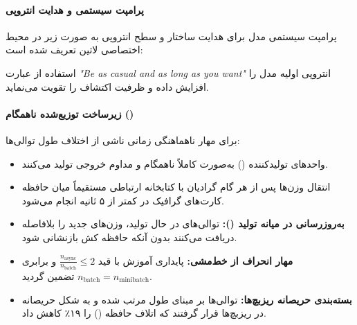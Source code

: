 \paragraph*{پرامپت سیستمی و هدایت انتروپی}
پرامپت سیستمی مدل برای هدایت ساختار و سطح انتروپی به صورت زیر در محیط اختصاصی لاتین تعریف شده است:
\begin{center}
\end{center}
استفاده از عبارت \textit{"Be as casual and as long as you want"} انتروپی اولیه مدل را افزایش داده و ظرفیت اکتشاف را تقویت می‌نماید.

\paragraph*{زیرساخت توزیع‌شده ناهمگام ()}
برای مهار ناهماهنگی زمانی ناشی از اختلاف طول توالی‌ها:
\begin{itemize}
    \item واحدهای تولیدکننده () به‌صورت کاملاً ناهمگام و مداوم خروجی تولید می‌کنند.
    \item انتقال وزن‌ها پس از هر گام گرادیان با کتابخانه ارتباطی  مستقیماً میان حافظه کارت‌های گرافیک در کمتر از ۵ ثانیه انجام می‌شود.
    \item \textbf{به‌روزرسانی در میانه تولید ():} توالی‌های در حال تولید، وزن‌های جدید را بلافاصله دریافت می‌کنند بدون آنکه حافظه کش  بازنشانی شود.
    \item \textbf{مهار انحراف از خط‌مشی:} پایداری آموزش با قید $\frac{n_{\text{async}}}{n_{\text{batch}}} \le 2$ و برابری $n_{\text{batch}} = n_{\text{minibatch}}$ تضمین گردید.
    \item \textbf{بسته‌بندی حریصانه ریزبچ‌ها:} توالی‌ها بر مبنای طول مرتب شده و به شکل حریصانه در ریزبچ‌ها قرار گرفتند که اتلاف حافظه () را ۱۹٪ کاهش داد.
\end{itemize}

